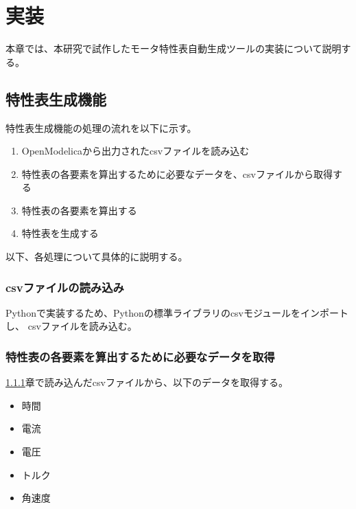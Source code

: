 \chapter{実装}\label{cha:Implementation}

本章では、本研究で試作したモータ特性表自動生成ツールの実装について説明する。

\section{特性表生成機能}\label{tokuseihyou_seisei}



特性表生成機能の処理の流れを以下に示す。
\begin{enumerate}
    \item OpenModelicaから出力されたcsvファイルを読み込む
    \item 特性表の各要素を算出するために必要なデータを、csvファイルから取得する
    \item 特性表の各要素を算出する
    \item 特性表を生成する
\end{enumerate}

以下、各処理について具体的に説明する。

\subsection{csvファイルの読み込み}\label{sub:csvfairu}
Pythonで実装するため、Pythonの標準ライブラリのcsvモジュールをインポートし、
csvファイルを読み込む。

\subsection{特性表の各要素を算出するために必要なデータを取得}\label{sub:syutoku_data}
\ref{sub:csvfairu}章で読み込んだcsvファイルから、以下のデータを取得する。

\begin{itemize}
    \item 時間
    \item 電流
    \item 電圧
    \item トルク
    \item 角速度
\end{itemize}

